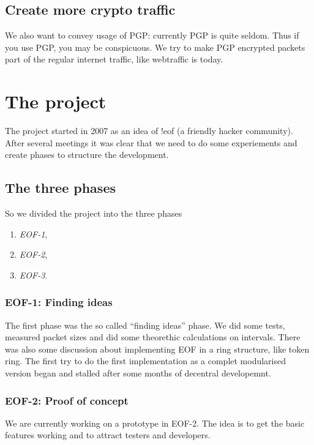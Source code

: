 \documentclass[12pt,a4paper]{book}
\begin{document}
\subsection{Create more crypto traffic}
We also want to convey usage of PGP: currently PGP is quite seldom.
Thus if you use PGP, you may be conspicuous. We try to make PGP encrypted
packets part of the regular internet traffic, like webtraffic is today.
\section{The project}
The project started in 2007 as an idea of !eof\cite{!eof}
(a friendly hacker community). After several meetings it was clear that
we need to do some experiements and create phases to structure the
development.
\subsection{The three phases}
So we divided the project into the three phases
\begin{enumerate}
\item \emph{EOF-1},
\item \emph{EOF-2},
\item \emph{EOF-3}.
\end{enumerate}
\subsubsection{EOF-1: Finding ideas}
The first phase was the so called "`finding ideas"' phase. We did some tests,
measured packet sizes and did some theorethic calculations on intervals.
There was also some discussion about implementing EOF in a ring structure,
like token ring\cite{token-ring}.
The first try to do the first implementation as a complet modularised
version began and stalled after some months of decentral developemnt.
\subsubsection{EOF-2: Proof of concept}
We are currently working on a prototype in EOF-2. The idea is to get the
basic features working and to attract testers and developers.
\end{document}
